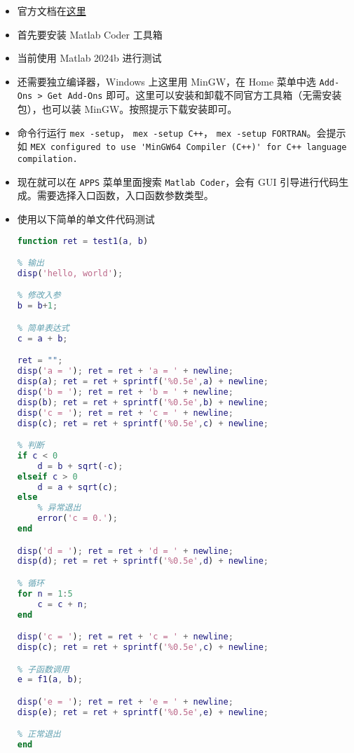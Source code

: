 
\begin{itemize}
\item 官方文档在\href{https://ch.mathworks.com/help/coder/index.html?s_tid=CRUX_lftnav}{这里}
\item 首先要安装 Matlab Coder 工具箱
\item 当前使用 Matlab 2024b 进行测试
\item 还需要独立编译器，Windows 上这里用 MinGW，在 Home 菜单中选 \verb`Add-Ons > Get Add-Ons` 即可。这里可以安装和卸载不同官方工具箱（无需安装包），也可以装 MinGW。按照提示下载安装即可。
\item 命令行运行 \verb`mex -setup`， \verb`mex -setup C++`， \verb`mex -setup FORTRAN`。会提示如 \verb`MEX configured to use 'MinGW64 Compiler (C++)' for C++ language compilation.`
\item 现在就可以在 \verb`APPS` 菜单里面搜索 \verb`Matlab Coder`，会有 GUI 引导进行代码生成。需要选择入口函数，入口函数参数类型。
\item 使用以下简单的单文件代码测试
\begin{lstlisting}[language=matlab,caption=test1.m]
% 代码生成的入口函数，arg* 限制为字符串，ret 限制为非负整数
function ret = test1(a, b)

% 输出
disp('hello, world');

% 修改入参
b = b+1;

% 简单表达式
c = a + b;

ret = "";
disp('a = '); ret = ret + 'a = ' + newline;
disp(a); ret = ret + sprintf('%0.5e',a) + newline;
disp('b = '); ret = ret + 'b = ' + newline;
disp(b); ret = ret + sprintf('%0.5e',b) + newline;
disp('c = '); ret = ret + 'c = ' + newline;
disp(c); ret = ret + sprintf('%0.5e',c) + newline;

% 判断
if c < 0
    d = b + sqrt(-c);
elseif c > 0
    d = a + sqrt(c);
else
    % 异常退出
    error('c = 0.');
end

disp('d = '); ret = ret + 'd = ' + newline;
disp(d); ret = ret + sprintf('%0.5e',d) + newline;

% 循环
for n = 1:5
    c = c + n;
end

disp('c = '); ret = ret + 'c = ' + newline;
disp(c); ret = ret + sprintf('%0.5e',c) + newline;

% 子函数调用
e = f1(a, b);

disp('e = '); ret = ret + 'e = ' + newline;
disp(e); ret = ret + sprintf('%0.5e',e) + newline;

% 正常退出
end


\end{lstlisting}
\end{itemize}
